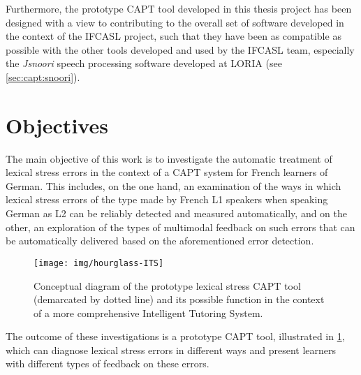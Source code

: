 Furthermore, the prototype CAPT tool developed in this thesis project has been designed with a view to contributing to the overall set of software developed in the context of the IFCASL project, such that they have been as compatible as possible with the other tools developed and used by the IFCASL team, especially the \textit{Jsnoori} speech processing software developed at LORIA (see \cref{sec:capt:snoori}).


\section{Objectives}
\label{sec:intro:objectives}


The main objective of this work is to investigate the automatic treatment of lexical stress errors in the context of a CAPT system for French learners of German. This includes, on the one hand, an examination of the ways in which lexical stress errors of the type made by French L1 speakers when speaking German as L2 can be reliably detected and measured %
automatically, and on the other, an exploration of the types of multimodal feedback on such errors that can be automatically delivered based on the aforementioned error detection. 
%
	\begin{figure}[thb] 
		\centering
		\texttt{[image: img/hourglass-ITS]} 
		\caption[Conceptual diagram of the prototype lexical stress CAPT tool]{Conceptual diagram of the prototype lexical stress CAPT tool (demarcated by dotted line) and its possible function in the context of a more comprehensive Intelligent Tutoring System.}
		\label{fig:hourglass-ITS}
	\end{figure}
%
The outcome of these investigations is a prototype CAPT tool, illustrated in \cref{fig:hourglass-ITS},
which can diagnose lexical stress errors in different ways and present learners with different types of feedback on these errors. 


